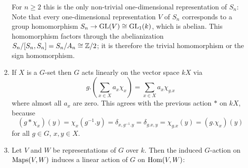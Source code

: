 \begin{example}
\begin{enumerate}
      For $n \geq 2$ this is the only non-trivial one-dimensional representation of $S_n$:
      Note that every one-dimensional representation $V$ of $S_n$ corresponds to a group homomorphism $S_n \to \operatorname{GL}(V) \cong \operatorname{GL}_1(k)$, which is abelian.
      This homomorphism factors through the abelianization $S_n/[S_n, S_n] = S_n/A_n \cong \mathbb{Z}/2$; it is therefore the trivial homomorphism or the sign homomorphism.
    \item
      If $X$ is a $G$-set then $G$ acts linearly on the vector space $kX$ via
      \[
          g.\left(\sum_{x \in X} a_x \chi_x\right)
        = \sum_{x \in X} a_x \chi_{g.x}
      \]
      where almost all $a_x$ are zero.
      This agrees with the previous action $*$ on $kX$, because
      \[
          (g * \chi_x)(y)
        = \chi_x(g^{-1}.y)
        = \delta_{x, g^{-1}.y}
        = \delta_{g.x, y}
        = \chi_{g.x}(y)
        = (g.\chi_x)(y)
      \]
      for all $g \in G$, $x, y \in X$.
    \item
      Let $V$ and $W$ be representations of $G$ over $k$.
      Then the induced $G$-action on $\operatorname{Maps}(V,W)$ induces a linear action of $G$ on $\operatorname{Hom}(V,W)$:
      

\end{enumerate}
\end{example}
